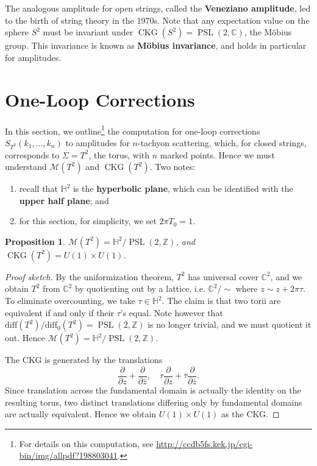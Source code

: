 \documentclass{report}
\theoremstyle{plain}
\newtheorem{proposition}[theorem]{Proposition}
\theoremstyle{definition}
\theoremstyle{remark}
\newcommand{\bC}{\mathbb{C}}
\newcommand{\bZ}{\mathbb{Z}}
\newcommand{\bH}{\mathbb{H}}
\newcommand{\cM}{\mathcal{M}}
\newcommand{\diff}{\mathrm{diff}}
\DeclareMathOperator{\PSL}{PSL}
\DeclareMathOperator{\CKG}{CKG}
\newcommand{\pder}[2]{\frac{\partial #1}{\partial #2}}
\newcommand{\bz}{\bar{z}}
\begin{document}
The analogous amplitude for open strings, called the {\bf Veneziano
  amplitude}, led to the birth of string theory in the 1970s. Note
that any expectation value on the sphere $S^2$ must be invariant under
$\CKG(S^2) = \PSL(2, \bC)$, the M\"obius group. This invariance is
known as {\bf M\"obius invariance}, and holds in particular for
amplitudes.

\section{One-Loop Corrections}

In this section, we outline\footnote{For details on this computation,
  see \url{http://ccdb5fs.kek.jp/cgi-bin/img/allpdf?198803041}.} the
computation for one-loop corrections $S_{T^2}(k_1, \ldots, k_n)$ to
amplitudes for $n$-tachyon scattering, which, for closed strings,
corresponds to $\Sigma = T^2$, the torus, with $n$ marked points.
Hence we must understand $\cM(T^2)$ and $\CKG(T^2)$. Two notes:
\begin{enumerate}
\item recall that $\bH^2$ is the {\bf hyperbolic plane}, which can be
  identified with the {\bf upper half plane}; and
\item for this section, for simplicity, we set $2\pi T_0 = 1$.
\end{enumerate}

\begin{proposition}
  $\cM(T^2) = \bH^2/\PSL(2, \bZ)$, and $\CKG(T^2) = U(1) \times U(1)$.
\end{proposition}

\begin{proof}[Proof sketch]
  By the uniformization theorem, $T^2$ has universal cover $\bC^2$,
  and we obtain $T^2$ from $\bC^2$ by quotienting out by a lattice,
  i.e. $\bC^2/\sim$ where $z \sim z + 2\pi \tau$. To eliminate
  overcounting, we take $\tau \in \bH^2$. The claim is that two torii
  are equivalent if and only if their $\tau$'s equal. Note however
  that $\diff(T^2)/\diff_0(T^2) = \PSL(2, \bZ)$ is no longer trivial,
  and we must quotient it out. Hence $\cM(T^2) = \bH^2/\PSL(2, \bZ)$.

  The CKG is generated by the translations
  \[ \pder{}{z} + \pder{}{\bz}, \quad \tau \pder{}{z} + \bar{\tau} \pder{}{\bz}. \]
  Since translation across the fundamental domain is actually the
  identity on the resulting torus, two distinct translations differing
  only by fundamental domains are actually equivalent. Hence we obtain
  $U(1) \times U(1)$ as the CKG.
\end{proof}
\end{document}
